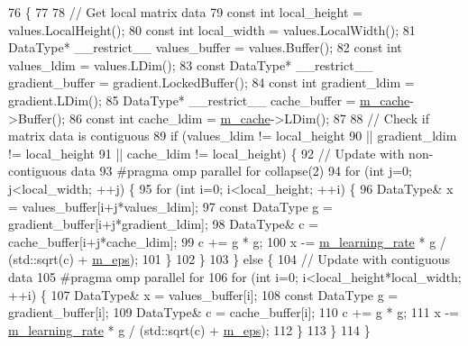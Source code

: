\begin{DoxyCode}
76                                                                          \{
77 
78   \textcolor{comment}{// Get local matrix data}
79   \textcolor{keyword}{const} \textcolor{keywordtype}{int} local\_height = values.LocalHeight();
80   \textcolor{keyword}{const} \textcolor{keywordtype}{int} local\_width = values.LocalWidth();
81   DataType* \_\_restrict\_\_ values\_buffer = values.Buffer();
82   \textcolor{keyword}{const} \textcolor{keywordtype}{int} values\_ldim = values.LDim();
83   \textcolor{keyword}{const} DataType* \_\_restrict\_\_ gradient\_buffer = gradient.LockedBuffer();
84   \textcolor{keyword}{const} \textcolor{keywordtype}{int} gradient\_ldim = gradient.LDim();
85   DataType* \_\_restrict\_\_ cache\_buffer = \hyperlink{classlbann_1_1adagrad_a5eaf0d220d2be78d91455ba85eef3e9a}{m\_cache}->Buffer();
86   \textcolor{keyword}{const} \textcolor{keywordtype}{int} cache\_ldim = \hyperlink{classlbann_1_1adagrad_a5eaf0d220d2be78d91455ba85eef3e9a}{m\_cache}->LDim();
87 
88   \textcolor{comment}{// Check if matrix data is contiguous}
89   \textcolor{keywordflow}{if} (values\_ldim != local\_height
90       || gradient\_ldim != local\_height
91       || cache\_ldim != local\_height) \{
92     \textcolor{comment}{// Update with non-contiguous data}
93 \textcolor{preprocessor}{    #pragma omp parallel for collapse(2)}
94     \textcolor{keywordflow}{for} (\textcolor{keywordtype}{int} j=0; j<local\_width; ++j) \{
95       \textcolor{keywordflow}{for} (\textcolor{keywordtype}{int} i=0; i<local\_height; ++i) \{
96         DataType& x = values\_buffer[i+j*values\_ldim];
97         \textcolor{keyword}{const} DataType g = gradient\_buffer[i+j*gradient\_ldim];
98         DataType& c = cache\_buffer[i+j*cache\_ldim];
99         c += g * g;
100         x -= \hyperlink{classlbann_1_1optimizer_ad393dcdcb82b44510c586ed5ec46d4dd}{m\_learning\_rate} * g / (std::sqrt(c) + \hyperlink{classlbann_1_1adagrad_aace057f88a46dab327f6409716dbe8de}{m\_eps});
101       \}
102     \}
103   \} \textcolor{keywordflow}{else} \{
104     \textcolor{comment}{// Update with contiguous data}
105 \textcolor{preprocessor}{    #pragma omp parallel for}
106     \textcolor{keywordflow}{for} (\textcolor{keywordtype}{int} i=0; i<local\_height*local\_width; ++i) \{
107       DataType& x = values\_buffer[i];
108       \textcolor{keyword}{const} DataType g = gradient\_buffer[i];
109       DataType& c = cache\_buffer[i];
110       c += g * g;
111       x -= \hyperlink{classlbann_1_1optimizer_ad393dcdcb82b44510c586ed5ec46d4dd}{m\_learning\_rate} * g / (std::sqrt(c) + \hyperlink{classlbann_1_1adagrad_aace057f88a46dab327f6409716dbe8de}{m\_eps});
112     \}
113   \}
114 \}
\end{DoxyCode}
